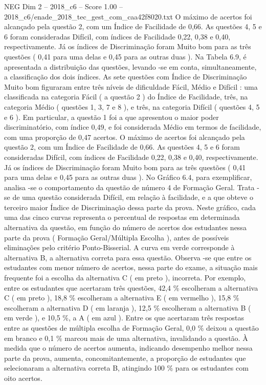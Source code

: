 \begin{textsample}{NEG Dim 2 – 2018\_c6 – Score 1.00 – 2018\_c6/enade\_2018\_tec\_gest\_com\_caa42f8020.txt}
O máximo de acertos foi alcançado pela questão 2, com um Índice de Facilidade de 0,66.
As questões 4, 5 e 6 foram consideradas Difícil, com índices de Facilidade 0,22, 0,38 e 0,40, respectivamente.
Já os índices de Discriminação foram Muito bom para as três questões ( 0,41 para uma delas e 0,45 para as outras duas ).
Na Tabela 6.9, é apresentada a distribuição das questões, levando -se em conta, simultaneamente, a classificação dos dois índices.
As sete questões com Índice de Discriminação Muito bom figuraram entre três níveis de dificuldade Fácil, Médio e Difícil : uma classificada na categoria Fácil ( a questão 2 ) do Índice de Facilidade, três, na categoria Médio ( questões 1, 3, 7 e 8 ), e três, na categoria Difícil ( questões 4, 5 e 6 ).
Em particular, a questão 1 foi a que apresentou o maior poder discriminatório, com índice 0,49, e foi considerada Médio em termos de facilidade, com uma proporção de 0,47 acertos.
O máximo de acertos foi alcançado pela questão 2, com um Índice de Facilidade de 0,66.
As questões 4, 5 e 6 foram consideradas Difícil, com índices de Facilidade 0,22, 0,38 e 0,40, respectivamente.
Já os índices de Discriminação foram Muito bom para as três questões ( 0,41 para uma delas e 0,45 para as outras duas ).
No Gráfico 6.4, para exemplificar, analisa -se o comportamento da questão de número 4 de Formação Geral.
Trata -se de uma questão considerada Difícil, em relação à facilidade, e a que obteve o terceiro maior Índice de Discriminação dessa parte da prova.
Neste gráfico, cada uma das cinco curvas representa o percentual de respostas em determinada alternativa da questão, em função do número de acertos dos estudantes nessa parte da prova ( Formação Geral/Múltipla Escolha ), antes de possíveis eliminações pelo critério Ponto-Bisserial.
A curva em verde corresponde à alternativa B, a alternativa correta para essa questão.
Observa -se que entre os estudantes com menor número de acertos, nessa parte do exame, a situação mais frequente foi a escolha da alternativa C ( em preto ), incorreta.
Por exemplo, entre os estudantes que acertaram três questões, 42,4 \% escolheram a alternativa C ( em preto ), 18,8 \% escolheram a alternativa E ( em vermelho ), 15,8 \% escolheram a alternativa D ( em laranja ), 12,5 \% escolheram a alternativa B ( em verde ), e 10,5 \%, a A ( em azul ).
Entre os que acertaram três respostas entre as questões de múltipla escolha de Formação Geral, 0,0 \% deixou a questão em branco e 0,1 \% marcou mais de uma alternativa, invalidando a questão.
À medida que o número de acertos aumenta, indicando desempenho melhor nessa parte da prova, aumenta, concomitantemente, a proporção de estudantes que selecionaram a alternativa correta B, atingindo 100 \% para os estudantes com oito acertos.

\end{textsample}

